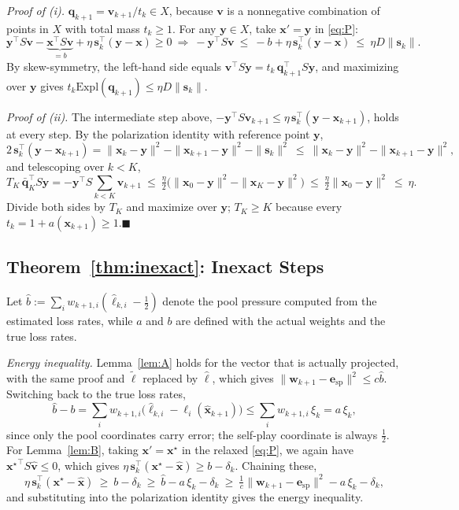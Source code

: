 \documentclass{article}
\theoremstyle{plain}
\theoremstyle{remark}
\newcommand{\Expl}{\mathrm{Expl}}
\newcommand{\bx}{{\bm{x}}}
\newcommand{\by}{{\bm{y}}}
\newcommand{\bv}{{\bm{v}}}
\newcommand{\bw}{{\bm{w}}}
\newcommand{\bq}{{\bm{q}}}
\newcommand{\be}{{\bm{e}}}
\newcommand{\bell}{{\bm{\ell}}}
\newcommand{\aug}{\tilde{\bell}}
\newcommand{\xs}{\bx^{\star}}
\newcommand{\dx}{{\bm{s}}}
\newcommand{\esp}{\be_{\mathrm{sp}}}
\begin{document}
\textit{Proof of (i).} $\bq_{k+1}=\bv_{k+1}/t_k\in X$, because $\bv$ is a nonnegative combination of points in $X$ with total mass $t_k\ge1$. For any $\by\in X$, take $\bx'=\by$ in \eqref{eq:P}:
\[
\by^\top S\bv-\underbrace{\bx^\top S\bv}_{=b}+\eta\,\dx_k^\top(\by-\bx)\ge0
\ \Longrightarrow\
-\by^\top S\bv\ \le\ -b+\eta\,\dx_k^\top(\by-\bx)\ \le\ \eta D\|\dx_k\| .
\]
By skew-symmetry, the left-hand side equals $\bv^\top S\by=t_k\,\bq_{k+1}^\top S\by$, and maximizing over $\by$ gives $t_k\Expl(\bq_{k+1})\le\eta D\|\dx_k\|$.

\textit{Proof of (ii).} The intermediate step above, $-\by^\top S\bv_{k+1}\le\eta\,\dx_k^\top(\by-\bx_{k+1})$, holds at every step. By the polarization identity with reference point $\by$,
\[
2\,\dx_k^\top(\by-\bx_{k+1})=\|\bx_k-\by\|^2-\|\bx_{k+1}-\by\|^2-\|\dx_k\|^2\ \le\ \|\bx_k-\by\|^2-\|\bx_{k+1}-\by\|^2 ,
\]
and telescoping over $k<K$,
\[
T_K\,\bar{\bq}_K^\top S\by=-\by^\top S\sum_{k<K}\bv_{k+1}\ \le\ \tfrac\eta2\big(\|\bx_0-\by\|^2-\|\bx_K-\by\|^2\big)\ \le\ \tfrac\eta2\|\bx_0-\by\|^2\ \le\ \eta .
\]
Divide both sides by $T_K$ and maximize over $\by$; $T_K\ge K$ because every $t_k=1+a(\bx_{k+1})\ge1$.\hfill$\blacksquare$

\subsection{Theorem~\ref{thm:inexact}: Inexact Steps}
\label{app:inexact}

Let $\hat b:=\sum_iw_{k+1,i}(\hat\ell_{k,i}-\tfrac12)$ denote the pool pressure computed from the estimated loss rates, while $a$ and $b$ are defined with the actual weights and the true loss rates.

\textit{Energy inequality.} Lemma~\ref{lem:A} holds for the vector that is actually projected, with the same proof and $\aug$ replaced by $\hat{\bell}$, which gives $\|\bw_{k+1}-\esp\|^2\le c\hat b$. Switching back to the true loss rates,
\[
\hat b-b=\sum_iw_{k+1,i}\big(\hat\ell_{k,i}-\ell_i(\hat \bx_{k+1})\big)\le\sum_iw_{k+1,i}\,\xi_k=a\,\xi_k ,
\]
since only the pool coordinates carry error; the self-play coordinate is always $\tfrac12$. For Lemma~\ref{lem:B}, taking $\bx'=\xs$ in the relaxed \eqref{eq:P}, we again have ${\xs}^\top S\hat \bv\le0$, which gives $\eta\,\dx_k^\top(\xs-\hat \bx)\ge b-\delta_k$. Chaining these,
\[
\eta\,\dx_k^\top(\xs-\hat \bx)\ \ge\ b-\delta_k\ \ge\ \hat b-a\,\xi_k-\delta_k\ \ge\ \tfrac1c\|\bw_{k+1}-\esp\|^2-a\,\xi_k-\delta_k ,
\]
and substituting into the polarization identity gives the energy inequality.
\end{document}

